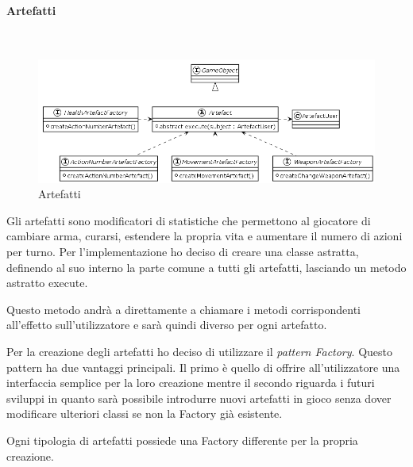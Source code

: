 \documentclass[a4paper,titlepage,12pt]{article}
\begin{document}
\newpage
\paragraph{Artefatti}
\par \noindent \\
\begin{figure}[H]
    \centering
    \includegraphics[scale=0.55]{img/uml/Artefact.png}
    \caption{Artefatti}
    \label{fig: Artefatti}
\end{figure}
\par \noindent Gli artefatti sono modificatori di statistiche che permettono al giocatore di cambiare arma, curarsi, estendere la propria vita e aumentare il numero di azioni per turno. 
Per l’implementazione ho deciso di creare una classe astratta, definendo al suo interno la parte comune a tutti gli artefatti,  lasciando un metodo astratto execute.
\par \noindent Questo metodo andrà a direttamente a chiamare i metodi corrispondenti all’effetto sull’utilizzatore e sarà quindi diverso per ogni artefatto. 
\par \noindent Per la creazione degli artefatti ho deciso di utilizzare il \textit{pattern Factory}. Questo pattern ha due vantaggi principali. Il primo è quello di offrire all’utilizzatore una interfaccia semplice per la loro creazione mentre il secondo riguarda i futuri sviluppi in quanto sarà possibile introdurre nuovi artefatti in gioco senza dover modificare ulteriori classi se non la Factory già esistente. 
\par \noindent Ogni tipologia di artefatti possiede una Factory differente per la propria creazione.

\newpage
\end{document}
